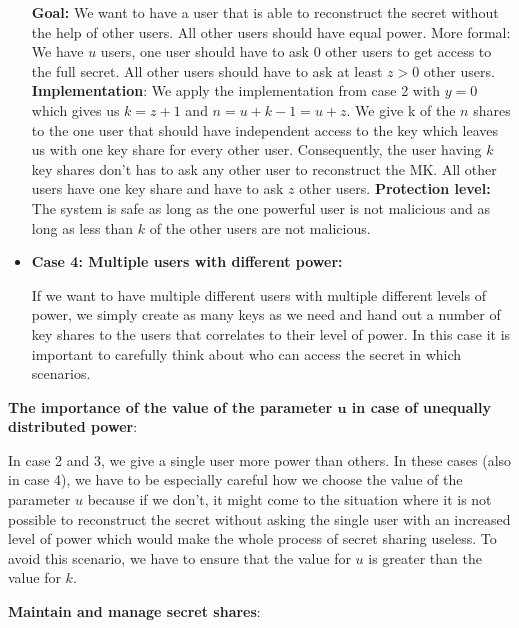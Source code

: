 \documentclass[runningheads]{llncs}
\begin{document}
\begin{itemize}
     \textbf{Goal:} We want to have a user that is able to reconstruct the secret without the help of other users. All other users should have equal power. More formal: We have $u$ users, one user should have to ask $0$ other users to get access to the full secret. All other users should have to ask at least $z>0$ other users. \newline
     \textbf{Implementation}: We apply the implementation from case 2 with $y = 0$ which gives us $k = z+1$ and $n = u + k - 1 = u + z$. We give k of the $n$ shares to the one user that should have independent access to the key which leaves us with one key share for every other user. Consequently, the user having $k$ key shares don't has to ask any other user to reconstruct the MK. All other users have one key share and have to ask $z$ other users.  \newline
     \textbf{Protection level:} The system is safe as long as the one powerful user is not malicious and as long as less than $k$ of the other users are not malicious.\newline
     
     \item \textbf{Case 4: Multiple users with different power:} \newline
     
     If we want to have multiple different users with multiple different levels of power, we simply create as many keys as we need and hand out a number of key shares to the users that correlates to their level of power. In this case it is important to carefully think about who can access the secret in which scenarios.
\end{itemize}

\noindent
\textbf{The importance of the value of the parameter $\bm{u}$ in case of unequally distributed power}:
\newline

In case 2 and 3, we give a single user more power than others. In these cases (also in case 4), we have to be especially careful how we choose the value of the parameter $u$ because if we don't, it might come to the situation where it is not possible to reconstruct the secret without asking the single user with an increased level of power which would make the whole process of secret sharing useless. To avoid this scenario, we have to ensure that the value for $u$ is greater than the value for $k$.
\newline

\noindent
\textbf{Maintain and manage secret shares}:
\newline
\end{document}
